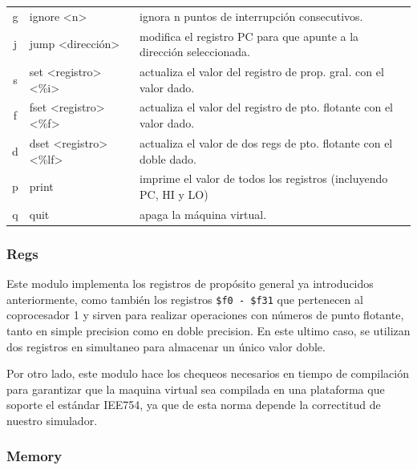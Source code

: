 \documentclass[12pt]{article}
\begin{document}
\begin{table}[H]
\begin{tabular}{@{}cll@{}}
g                         & ignore \textless n\textgreater                                & ignora n puntos de interrupción consecutivos.                                 \\
j                         & jump \textless dirección\textgreater                          & modifica el registro PC para que apunte a la dirección seleccionada.          \\
s                         & set \textless registro\textgreater \textless\%i\textgreater   & actualiza el valor del registro de prop. gral. con el valor dado.             \\
f                         & fset \textless registro\textgreater \textless\%f\textgreater  & actualiza el valor del registro de pto. flotante con el valor dado.           \\
d                         & dset \textless registro\textgreater \textless\%lf\textgreater & actualiza el valor de dos regs de pto. flotante con el doble dado. \\
p                         & print                                                        & imprime el valor de todos los registros (incluyendo PC, HI y LO)              \\
q                         & quit                                                         & apaga la máquina virtual.                                                    
\end{tabular}
\end{table}

\subsubsection{Regs}

Este modulo implementa los registros de propósito general ya introducidos anteriormente, como también los registros \texttt{\$f0 - \$f31} que pertenecen al coprocesador 1 y sirven para realizar operaciones con números de punto flotante, tanto en simple precision como en doble precision. En este ultimo caso, se utilizan dos registros en simultaneo para almacenar un único valor doble.

Por otro lado, este modulo hace los chequeos necesarios en tiempo de compilación para garantizar que la maquina virtual sea compilada en una plataforma que soporte el estándar IEE754, ya que de esta norma depende la correctitud de nuestro simulador.

\subsubsection{Memory}
\end{document}
